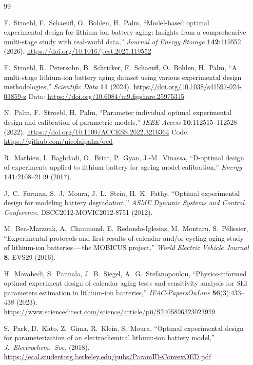 \documentclass[11pt,letterpaper]{article}
\newcommand{\dash}{\,---\,}
\begin{document}
\newpage
{}
\begin{thebibliography}{99}\small

 F.~Stroebl, F.~Schaeufl, O.~Bohlen, H.~Palm, ``Model-based optimal experimental design for lithium-ion battery aging: Insights from a comprehensive multi-stage study with real-world data,'' \emph{Journal of Energy Storage} \textbf{142}:119552 (2026). \url{https://doi.org/10.1016/j.est.2025.119552}

 F.~Stroebl, R.~Petersohn, B.~Schricker, F.~Schaeufl, O.~Bohlen, H.~Palm, ``A multi-stage lithium-ion battery aging dataset using various experimental design methodologies,'' \emph{Scientific Data} \textbf{11} (2024). \url{https://doi.org/10.1038/s41597-024-03859-z} Data: \url{https://doi.org/10.6084/m9.figshare.25975315}

 N.~Palm, F.~Stroebl, H.~Palm, ``Parameter individual optimal experimental design and calibration of parametric models,'' \emph{IEEE Access} \textbf{10}:112515--112528 (2022). \url{https://doi.org/10.1109/ACCESS.2022.3216364} Code: \url{https://github.com/nicolaipalm/oed}

 R.~Mathieu, I.~Baghdadi, O.~Briat, P.~Gyan, J.-M.~Vinassa, ``D-optimal design of experiments applied to lithium battery for ageing model calibration,'' \emph{Energy} \textbf{141}:2108--2119 (2017).

 J.~C.~Forman, S.~J.~Moura, J.~L.~Stein, H.~K.~Fathy, ``Optimal experimental design for modeling battery degradation,'' \emph{ASME Dynamic Systems and Control Conference}, DSCC2012-MOVIC2012-8751 (2012).

 M.~Ben-Marzouk, A.~Chaumond, E.~Redondo-Iglesias, M.~Montaru, S.~P\'elissier, ``Experimental protocols and first results of calendar and/or cycling aging study of lithium-ion batteries\dash the MOBICUS project,'' \emph{World Electric Vehicle Journal} \textbf{8}, EVS29 (2016).

 H.~Movahedi, S.~Pannala, J.~B.~Siegel, A.~G.~Stefanopoulou, ``Physics-informed optimal experiment design of calendar aging tests and sensitivity analysis for SEI parameters estimation in lithium-ion batteries,'' \emph{IFAC-PapersOnLine} \textbf{56}(3):433--438 (2023). \url{https://www.sciencedirect.com/science/article/pii/S2405896323023959}

 S.~Park, D.~Kato, Z.~Gima, R.~Klein, S.~Moura, ``Optimal experimental design for parameterization of an electrochemical lithium-ion battery model,'' \emph{J.\ Electrochem.\ Soc.} (2018). \url{https://ecal.studentorg.berkeley.edu/pubs/ParamID-ConvexOED.pdf}


\end{thebibliography}
\end{document}
